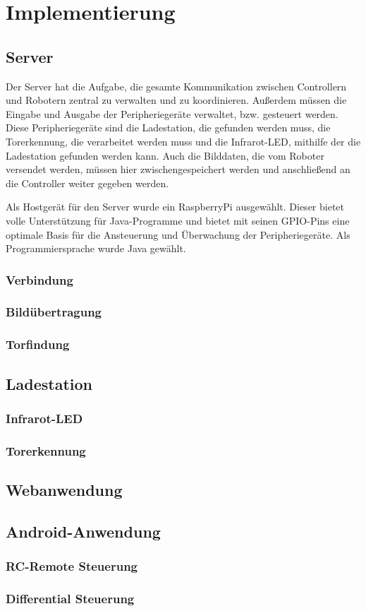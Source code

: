 \chapter{Implementierung}
\label{ch:implementierung}


\section{Server}
\label{impl:server}
Der Server hat die Aufgabe, die gesamte Kommunikation zwischen Controllern und Robotern zentral zu verwalten und zu koordinieren. Außerdem müssen die Eingabe und Ausgabe der Peripheriegeräte verwaltet, bzw. gesteuert werden. Diese Peripheriegeräte sind die Ladestation, die gefunden werden muss, die Torerkennung, die verarbeitet werden muss und die Infrarot-LED, mithilfe der die Ladestation gefunden werden kann. Auch die Bilddaten, die vom Roboter versendet werden, müssen hier zwischengespeichert werden und anschließend an die Controller weiter gegeben werden.

Als Hostgerät für den Server wurde ein RaspberryPi ausgewählt. Dieser bietet volle Unterstützung für Java-Programme und bietet mit seinen GPIO-Pins eine optimale Basis für die Ansteuerung und Überwachung der Peripheriegeräte. 
Als Programmiersprache wurde Java gewählt.



\subsection{Verbindung}
\subsection{Bildübertragung}
\subsection{Torfindung}

\section{Ladestation}
\subsection{Infrarot-LED}
\subsection{Torerkennung}

\section{Webanwendung}

\section{Android-Anwendung}
\subsection{RC-Remote Steuerung}
\subsection{Differential Steuerung}

